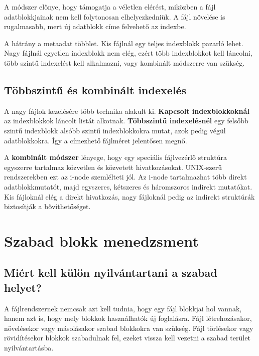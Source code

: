 A módszer előnye, hogy támogatja a véletlen elérést, miközben a fájl adatblokkjainak nem kell folytonosan elhelyezkedniük. A fájl növelése is rugalmasabb, mert új adatblokk címe felvehető az indexbe.

A hátrány a metaadat többlet. Kis fájlnál egy teljes indexblokk pazarló lehet. Nagy fájlnál egyetlen indexblokk nem elég, ezért több indexblokkot kell láncolni, több szintű indexelést kell alkalmazni, vagy kombinált módszerre van szükség.

\subsection{Többszintű és kombinált indexelés}

A nagy fájlok kezelésére több technika alakult ki. \textbf{Kapcsolt indexblokkoknál} az indexblokkok láncolt listát alkotnak. \textbf{Többszintű indexelésnél} egy felsőbb szintű indexblokk alsóbb szintű indexblokkokra mutat, azok pedig végül adatblokkokra. Így a címezhető fájlméret jelentősen megnő.

A \textbf{kombinált módszer} lényege, hogy egy speciális fájlvezérlő struktúra egyszerre tartalmaz közvetlen és közvetett hivatkozásokat. UNIX-szerű rendszerekben ezt az i-node szemlélteti jól. Az i-node tartalmazhat több direkt adatblokkmutatót, majd egyszeres, kétszeres és háromszoros indirekt mutatókat. Kis fájloknál elég a direkt hivatkozás, nagy fájloknál pedig az indirekt struktúrák biztosítják a bővíthetőséget.

\begin{center}

\end{center}

\section{Szabad blokk menedzsment}

\subsection{Miért kell külön nyilvántartani a szabad helyet?}

A fájlrendszernek nemcsak azt kell tudnia, hogy egy fájl blokkjai hol vannak, hanem azt is, hogy mely blokkok használhatók új foglalásra. Fájl létrehozásakor, növelésekor vagy másolásakor szabad blokkokra van szükség. Fájl törlésekor vagy rövidítésekor blokkok szabadulnak fel, ezeket vissza kell vezetni a szabad terület nyilvántartásba.

